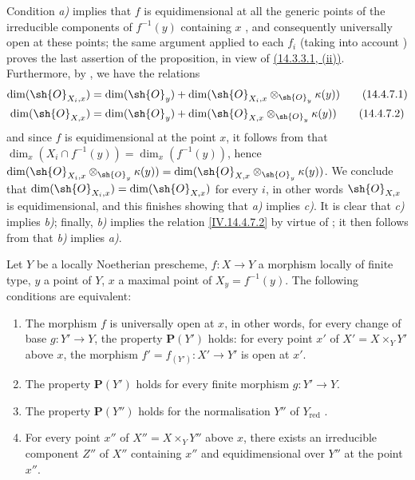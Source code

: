 Condition \emph{a)} implies that $f$ is equidimensional at all the generic points of the irreducible components of $f^{-1}(y)$ containing $x$ , and consequently  universally open at these points; the same argument applied to each $f_i$ (taking into account ) proves the last assertion of the proposition, in view of \hyperref[IV.14.3.3.1]{(14.3.3.1, (ii))}.
Furthermore, by , we have the relations
\begin{align}
  \dim(\sh{O}_{X_i,x}) &= \dim(\sh{O}_y) + \dim(\sh{O}_{X_i,x}\otimes_{\sh{O}_y}\kappa(y))
  \tag{14.4.7.1}\label{IV.14.4.7.1}\\
  \dim(\sh{O}_{X,x}) &= \dim(\sh{O}_y) + \dim(\sh{O}_{X,x}\otimes_{\sh{O}_y}\kappa(y))
  \tag{14.4.7.2}\label{IV.14.4.7.2}
\end{align}
and since $f$ is equidimensional at the point $x$, it follows from  that $\dim_x(X_i\cap f^{-1}(y))=\dim_x(f^{-1}(y))$, hence  $\dim(\sh{O}_{X_i,x}\otimes_{\sh{O}_y}\kappa(y))=\dim(\sh{O}_{X,x}\otimes_{\sh{O}_y}\kappa(y))$.
We conclude that $\dim(\sh{O}_{X_i,x})=\dim(\sh{O}_{X,x})$ for every $i$, in other words $\sh{O}_{X,x}$ is equidimensional, and this finishes showing that \emph{a)} implies \emph{c)}.
It is clear that \emph{c)} implies \emph{b)}; finally, \emph{b)} implies the relation \eqref{IV.14.4.7.2} by virtue of ; it then follows from  that \emph{b)} implies \emph{a)}.

\begin{proposition}[14.4.8]
\label{IV.14.4.8}
Let $Y$ be a locally Noetherian prescheme, $f:X\to Y$ a morphism locally of finite type, $y$ a point of $Y$, $x$ a maximal point of $X_y=f^{-1}(y)$.
The following conditions are equivalent:
\begin{enumerate}[label=\emph{\alph*)}]
  \item The morphism $f$ is universally open at $x$, in other words, for every change of base $g:Y'\to Y$, the property $\mathbf{P}(Y')$ holds: for every point $x'$ of $X'=X\times_Y Y'$ above $x$, the morphism $f'=f_{(Y')}:X'\to Y'$ is open at $x'$.
  \item[\emph{a$'$)}] The property $\mathbf{P}(Y')$ holds for every finite morphism $g:Y'\to Y$.
  \item[\emph{a$''$)}] The property $\mathbf{P}(Y'')$ holds for the normalisation $Y''$ of $Y_{\mathrm{red}}$ .
  \item For every point $x''$ of $X''=X\times_Y Y''$ above $x$, there exists an irreducible component $Z''$ of $X''$ containing $x''$ and equidimensional over $Y''$ at the point $x''$.
\end{enumerate}
\end{proposition}

